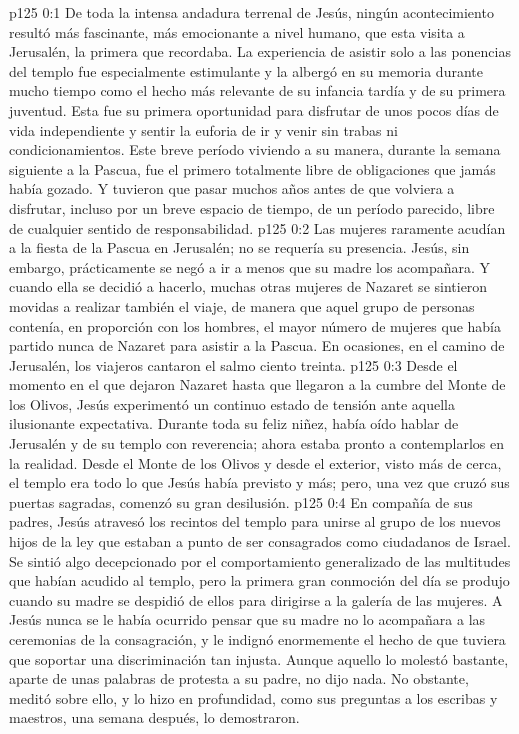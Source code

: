 \author{Comisión de seres intermedios}
\vs p125 0:1 De toda la intensa andadura terrenal de Jesús, ningún acontecimiento resultó más fascinante, más emocionante a nivel humano, que esta visita a Jerusalén, la primera que recordaba. La experiencia de asistir solo a las ponencias del templo fue especialmente estimulante y la albergó en su memoria durante mucho tiempo como el hecho más relevante de su infancia tardía y de su primera juventud. Esta fue su primera oportunidad para disfrutar de unos pocos días de vida independiente y sentir la euforia de ir y venir sin trabas ni condicionamientos. Este breve período viviendo a su manera, durante la semana siguiente a la Pascua, fue el primero totalmente libre de obligaciones que jamás había gozado. Y tuvieron que pasar muchos años antes de que volviera a disfrutar, incluso por un breve espacio de tiempo, de un período parecido, libre de cualquier sentido de responsabilidad.
\vs p125 0:2 \pc Las mujeres raramente acudían a la fiesta de la Pascua en Jerusalén; no se requería su presencia. Jesús, sin embargo, prácticamente se negó a ir a menos que su madre los acompañara. Y cuando ella se decidió a hacerlo, muchas otras mujeres de Nazaret se sintieron movidas a realizar también el viaje, de manera que aquel grupo de personas contenía, en proporción con los hombres, el mayor número de mujeres que había partido nunca de Nazaret para asistir a la Pascua. En ocasiones, en el camino de Jerusalén, los viajeros cantaron el salmo ciento treinta.
\vs p125 0:3 Desde el momento en el que dejaron Nazaret hasta que llegaron a la cumbre del Monte de los Olivos, Jesús experimentó un continuo estado de tensión ante aquella ilusionante expectativa. Durante toda su feliz niñez, había oído hablar de Jerusalén y de su templo con reverencia; ahora estaba pronto a contemplarlos en la realidad. Desde el Monte de los Olivos y desde el exterior, visto más de cerca, el templo era todo lo que Jesús había previsto y más; pero, una vez que cruzó sus puertas sagradas, comenzó su gran desilusión.
\vs p125 0:4 En compañía de sus padres, Jesús atravesó los recintos del templo para unirse al grupo de los nuevos hijos de la ley que estaban a punto de ser consagrados como ciudadanos de Israel. Se sintió algo decepcionado por el comportamiento generalizado de las multitudes que habían acudido al templo, pero la primera gran conmoción del día se produjo cuando su madre se despidió de ellos para dirigirse a la galería de las mujeres. A Jesús nunca se le había ocurrido pensar que su madre no lo acompañara a las ceremonias de la consagración, y le indignó enormemente el hecho de que tuviera que soportar una discriminación tan injusta. Aunque aquello lo molestó bastante, aparte de unas palabras de protesta a su padre, no dijo nada. No obstante, meditó sobre ello, y lo hizo en profundidad, como sus preguntas a los escribas y maestros, una semana después, lo demostraron.
